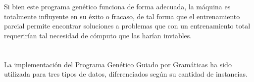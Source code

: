 \documentclass[spanish,a4paper,12pt,twoside]{report}
\begin{document}
  Si bien este programa genético funciona de forma adecuada, la máquina es totalmente influyente en su éxito o fracaso, de tal forma que el entrenamiento parcial permite encontrar soluciones a problemas que con un entrenamiento total requerirían tal necesidad de cómputo que las harían inviables.
  
  \newpage\cleardoublepage

  \chapter{\vspace{-3cm}{\LARGE 7. Resultados}}
  \setcounter{figure}{17}
  \vspace{-1cm}
  La implementación del Programa Genético Guiado por Gramáticas ha sido utilizada para tres tipos de datos, diferenciados según su cantidad de instancias. 
  
  \chapter{\vspace{-3cm}{\LARGE 8. Conclusiones y líneas futuras}}
  \vfill
  
\end{document}
